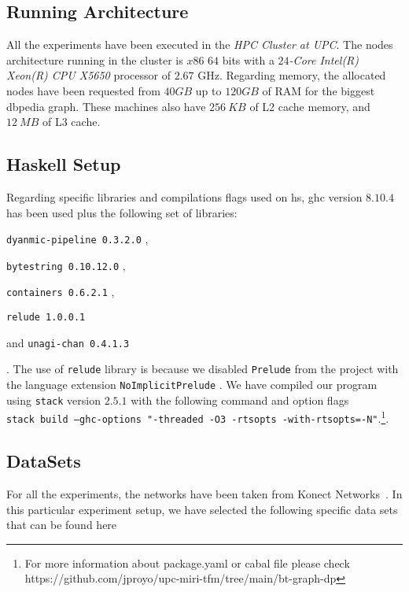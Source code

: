 \subsection{Running Architecture}
All the experiments have been executed in the \emph{HPC Cluster at UPC}. The nodes architecture running in the cluster is $x86$ $64$ bits with a \textit{$24$-Core Intel(R) Xeon(R) CPU X5650} processor of $2.67$ GHz. 
Regarding memory, the allocated nodes have been requested from $40 GB$ up to $120 GB$ of RAM for the biggest \acrshort{dbpedia} graph. These machines also have $256\ KB$ of L2 cache memory, and $12\ MB$ of L3 cache.

\subsection{Haskell Setup}
Regarding specific libraries and compilations flags used on \acrshort{hs}, \acrshort{ghc} version $8.10.4$ has been used plus the following set of libraries: 
\begin{inparaenum}[]
      \item \texttt{dyanmic-pipeline 0.3.2.0} \cite{dynamic-pipeline},
      \item \texttt{bytestring 0.10.12.0} \cite{bytestring},
      \item \texttt{containers 0.6.2.1} \cite{containers}, 
      \item \texttt{relude 1.0.0.1} \cite{relude}
      \item and \texttt{unagi-chan 0.4.1.3} \cite{unagi} 
  \end{inparaenum}. The use of \texttt{relude} library is because we disabled 
\texttt{Prelude} from the project with the language extension \texttt{NoImplicitPrelude} \cite{extensions}. 
We have compiled our program using \texttt{stack} version $2.5.1$ \cite{stack} with the following command and option flags\\ \texttt{stack build --ghc-options "-threaded -O3 -rtsopts -with-rtsopts=-N"}.\footnote{For more information about package.yaml or cabal file please check https://github.com/jproyo/upc-miri-tfm/tree/main/bt-graph-dp}.

\subsection{DataSets}\label{data:set}

For all the experiments, the networks have been taken from Konect Networks~\cite{konect}. 
In this particular experiment setup, we have selected the following specific data sets that can be found here \cite{konect:2017:dbpedia-recordlabel,konect:2017:moreno_crime,konect:2017:opsahl-ucforum,konect:2017:wang-amazon}

